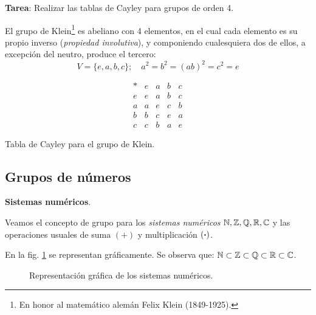 \textbf{Tarea}: Realizar las tablas de Cayley para grupos de orden 4.

\begin{fmd-example}
	El grupo de Klein\footnote{En honor al matemático alemán Felix Klein (1849-1925).} es abeliano con 4 elementos, en el cual cada elemento es su propio inverso (\textit{propiedad involutiva}), y componiendo cualesquiera dos de ellos, a excepción del neutro, produce el tercero:
	\[ V = \{ e, a, b, c \}; \quad a^2 = b^2 = (ab)^2 = c^2 = e \]
	\vspace{-15mm}
	\begin{table}[H]
		\centering
		\[ \begin{array}{c|cccc}
			\ast & e & a & b & c \\ \hline
			e & e & a & b & c \\
			a & a & e & c & b \\
			b & b & c & e & a\\
			c & c & b & a & e
		\end{array}\]
		\caption{Tabla de Cayley para el grupo de Klein.}
		\label{tab:Klein}
	\end{table}
\end{fmd-example}

\subsection{Grupos de números}

\textbf{Sistemas numéricos}.

Veamos el concepto de grupo para los \textit{sistemas numéricos} $\mathbb{N}, \mathbb{Z}, \mathbb{Q}, \mathbb{R}, \mathbb{C}$ y las operaciones usuales de suma $(+)$ y multiplicación $(\boldsymbol{\cdot})$.

En la fig. \ref{fig:sisnum} se representan gráficamente. Se observa que: $\mathbb{N} \subset \mathbb{Z} \subset \mathbb{Q} \subset \mathbb{R} \subset \mathbb{C}$.

\begin{figure}[h]
	\centering
	
	\caption{Representación gráfica de los sistemas numéricos.}
	\label{fig:sisnum}
\end{figure}

